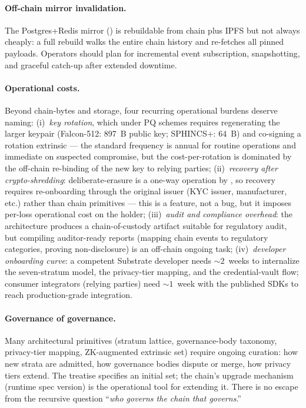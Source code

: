 \documentclass[11pt,a4paper,parskip=half-,DIV=12,headings=standardclasses]{scrartcl}
\theoremstyle{ncthm}
\theoremstyle{ncdef}
\begin{document}
\paragraph{Off-chain mirror invalidation.} The Postgres+Redis mirror
() is rebuildable from chain plus IPFS but
not always cheaply: a full rebuild walks the entire chain history and
re-fetches all pinned payloads. Operators should plan for incremental
event subscription, snapshotting, and graceful catch-up after
extended downtime.

\paragraph{Operational costs.} Beyond chain-bytes and storage, four
recurring operational burdens deserve naming: (i)~\emph{key
rotation}, which under PQ schemes requires regenerating the larger
keypair (Falcon-512: 897~B public key; SPHINCS+: 64~B) and
co-signing a rotation extrinsic --- the standard frequency is
annual for routine operations and immediate on suspected compromise,
but the cost-per-rotation is dominated by the off-chain re-binding
of the new key to relying parties; (ii)~\emph{recovery after
crypto-shredding}: deliberate-erasure is a one-way operation by
, so recovery requires re-onboarding
through the original issuer (KYC issuer, manufacturer, etc.) rather
than chain primitives --- this is a feature, not a bug, but it
imposes per-loss operational cost on the holder; (iii)~\emph{audit
and compliance overhead}: the architecture produces a
chain-of-custody artifact suitable for regulatory audit, but compiling
auditor-ready reports (mapping chain events to regulatory categories,
proving non-disclosure) is an off-chain ongoing task; (iv)~\emph{developer
onboarding curve}: a competent Substrate developer needs ${\sim}2$~weeks
to internalize the seven-stratum model, the privacy-tier mapping, and
the credential-vault flow; consumer integrators (relying parties)
need ${\sim}1$~week with the published SDKs to reach production-grade
integration.

\paragraph{Governance of governance.} Many architectural primitives
(stratum lattice, governance-body taxonomy, privacy-tier mapping,
ZK-augmented extrinsic set) require ongoing curation: how new strata
are admitted, how governance bodies dispute or merge, how privacy
tiers extend. The treatise specifies an initial set; the chain's
upgrade mechanism (runtime spec version) is the operational tool for
extending it. There is no escape from the recursive question
``\emph{who governs the chain that governs}.''
\end{document}
